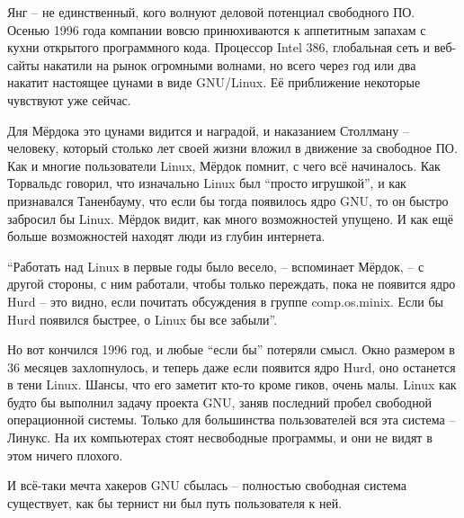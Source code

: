Янг -- не единственный, кого волнуют деловой потенциал свободного ПО. Осенью 1996 года компании вовсю принюхиваются к аппетитным запахам с кухни открытого программного кода. Процессор Intel 386, глобальная сеть и веб-сайты накатили на рынок огромными волнами, но всего через год или два накатит настоящее цунами в виде GNU/Linux. Её приближение некоторые чувствуют уже сейчас.

Для Мёрдока это цунами видится и наградой, и наказанием Столлману -- человеку, который столько лет своей жизни вложил в движение за свободное ПО. Как и многие пользователи Linux, Мёрдок помнит, с чего всё начиналось. Как Торвальдс говорил, что изначально Linux был \enquote{просто игрушкой}, и как признавался Таненбауму, что если бы тогда появилось ядро GNU, то он быстро забросил бы Linux.  Мёрдок видит, как много возможностей упущено. И как ещё больше возможностей находят люди из глубин интернета.

\enquote{Работать над Linux в первые годы было весело, -- вспоминает Мёрдок, -- с другой стороны, с ним работали, чтобы только переждать, пока не появится ядро Hurd -- это видно, если почитать обсуждения в группе comp.os.minix. Если бы Hurd появился быстрее, о Linux бы все забыли}.

Но вот кончился 1996 год, и любые \enquote{если бы} потеряли смысл. Окно размером в 36 месяцев захлопнулось, и теперь даже если появится ядро Hurd, оно останется в тени Linux. Шансы, что его заметит кто-то кроме гиков, очень малы. Linux как будто бы выполнил задачу проекта GNU, заняв последний пробел свободной операционной системы. Только для большинства пользователей вся эта система -- Линукс. На их компьютерах стоят несвободные программы, и они не видят в этом ничего плохого.

И всё-таки мечта хакеров GNU сбылась -- полностью свободная система существует, как бы тернист ни был путь пользователя к ней.

\theendnotes
\setcounter{endnote}{0}
